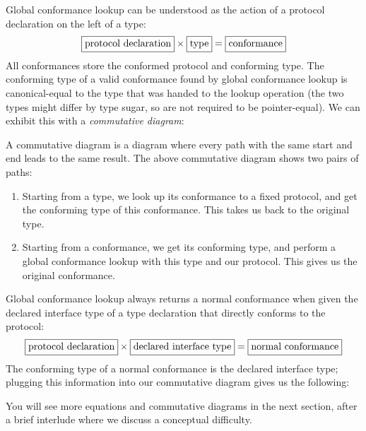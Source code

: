 \documentclass[a4paper,headsepline,bibliography=totoc,toc=flat,fleqn,twoside=semi]{scrbook}
\theoremstyle{definition}
\theoremstyle{definition}
\theoremstyle{definition}
\newcommand{\mathboxed}[1]{\boxed{\mbox{\vphantom{pI\texttt{pI}}#1}}}
\begin{document}
Global conformance lookup can be understood as the action of a protocol declaration on the left of a type:
\[\mathboxed{protocol declaration} \times \mathboxed{type} = \mathboxed{conformance}\]
All conformances store the conformed protocol and conforming type. The conforming type of a valid conformance found by global conformance lookup is canonical-equal to the type that was handed to the lookup operation (the two types might differ by type sugar, so are not required to be pointer-equal). We can exhibit this with a \emph{commutative diagram}:
\begin{quote}
\end{quote}
A commutative diagram is a diagram where every path with the same start and end leads to the same result. The above commutative diagram shows two pairs of paths:
\begin{enumerate}
\item Starting from a type, we look up its conformance to a fixed protocol, and get the conforming type of this conformance. This takes us back to the original type.
\item Starting from a conformance, we get its conforming type, and perform a global conformance lookup with this type and our protocol. This gives us the original conformance.
\end{enumerate}

Global conformance lookup always returns a normal conformance when given the declared interface type of a type declaration that directly conforms to the protocol:
\[\mathboxed{protocol declaration}\times\mathboxed{declared interface type}=\mathboxed{normal conformance}\]
The conforming type of a normal conformance is the declared interface type; plugging this information into our commutative diagram gives us the following:
\begin{quote}
\end{quote}
You will see more equations and commutative diagrams in the next section, after a brief interlude where we discuss a conceptual difficulty.
\end{document}
